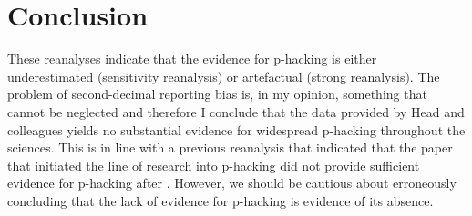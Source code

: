 \section*{Conclusion}
These reanalyses indicate that the evidence for p-hacking is either underestimated (sensitivity reanalysis) or artefactual  (strong reanalysis). The problem of second-decimal reporting bias is, in my opinion, something that cannot be neglected and therefore I conclude that the data provided by Head and colleagues yields no substantial evidence for widespread p-hacking throughout the sciences. This is in line with a previous reanalysis that indicated that the paper that initiated the line of research into p-hacking \cite{Masicampo2012} did not provide sufficient evidence for p-hacking after \cite{Lakens2014}. However, we should be cautious about erroneously concluding that the lack of evidence for p-hacking is evidence of its absence.